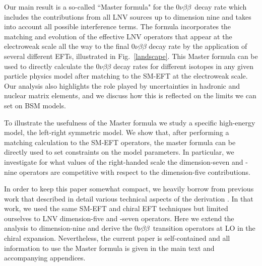 \documentclass[letterpaper,11pt]{article}
\newcommand{\NLDBD}{$0 \nu \beta \beta$}
\begin{document}
Our main result is   a so-called ``Master formula"  for the \NLDBD\  decay rate which includes the contributions from all LNV sources up to dimension nine and takes into account all possible interference terms. The formula incorporates the matching and evolution of the effective LNV operators that appear at the electroweak  scale all the way to the final $0\nu\beta\beta$ decay rate by the application of several different EFTs, illustrated in Fig.~\ref{landscape}. This Master formula can be used to directly calculate the $0\nu\beta\beta$ decay rates for different isotopes in any given particle physics model after matching to the  SM-EFT  at the electroweak scale.  Our analysis also highlights the role played by uncertainties in hadronic and nuclear matrix elements, and we discuss how this is reflected on the limits we can set on BSM models. 

To illustrate the usefulness of the Master formula we study a specific high-energy model, the left-right symmetric model. We show that, after performing a matching calculation to the SM-EFT operators, the master formula can be directly used to set constraints on the model parameters. In particular, we investigate for what values of the right-handed scale the dimension-seven and -nine operators are competitive with respect to the dimension-five contributions.


In order to keep this paper somewhat compact, we heavily borrow from  
previous work that described in detail various technical aspects of the derivation \cite{Cirigliano:2017djv,Cirigliano:2017tvr,Cirigliano:2018hja}. In that work, we used the same SM-EFT and chiral EFT techniques but limited ourselves to LNV dimension-five and -seven operators. Here we extend the analysis to dimension-nine and derive the \NLDBD\  transition operators at LO in the chiral expansion. Nevertheless, the current paper is self-contained and all information to use the Master formula is given in the main text and accompanying appendices.
\end{document}
